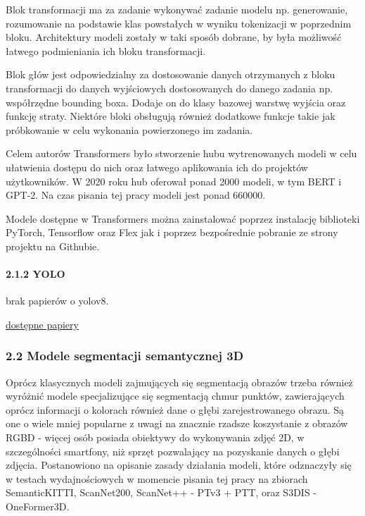 \documentclass[
]{article}
\begin{document}
Blok transformacji ma za zadanie wykonywać zadanie modelu np. generowanie, rozumowanie na podstawie klas powstałych w wyniku tokenizacji w poprzednim bloku. Architektury modeli zostały w taki sposób dobrane, by była możliwość łatwego podmieniania ich bloku transformacji.

Blok głów jest odpowiedzialny za dostosowanie danych otrzymanych z bloku transformacji do danych wyjściowych dostosowanych do danego zadania np. współrzędne bounding boxa. Dodaje on do klasy bazowej warstwę wyjścia oraz funkcję straty. Niektóre bloki obsługują również dodatkowe funkcje takie jak próbkowanie w celu wykonania powierzonego im zadania.

Celem autorów Transformers było stworzenie hubu wytrenowanych modeli w celu ułatwienia dostępu do nich oraz łatwego aplikowania ich do projektów użytkowników. W 2020 roku hub oferował ponad 2000 modeli, w tym BERT i GPT-2. Na czas pisania tej pracy modeli jest ponad 660000.

Modele dostępne w Transformers można zainstalować poprzez instalację biblioteki PyTorch, Tensorflow oraz Flex jak i poprzez bezpośrednie pobranie ze strony projektu na Githubie.

\paragraph{2.1.2 YOLO}\label{yolo}

brak papierów o yolov8.

\href{https://arxiv.org/pdf/2304.00501v1}{dostępne papiery}

\subsubsection{2.2 Modele segmentacji semantycznej 3D}\label{modele-segmentacji-semantycznej-3d}

Oprócz klasycznych modeli zajmujących się segmentacją obrazów trzeba również wyróżnić modele specjalizujące się segmentacją chmur punktów, zawierających oprócz informacji o kolorach również dane o głębi zarejestrowanego obrazu. Są one o wiele mniej popularne z uwagi na znacznie rzadsze koszystanie z obrazów RGBD - więcej osób posiada obiektywy do wykonywania zdjęć 2D, w szczególności smartfony, niż sprzęt pozwalający na pozyskanie danych o głębi zdjęcia. Postanowiono na opisanie zasady działania modeli, które odznaczyły się w testach wydajnościowych w momencie pisania tej pracy na zbiorach SemanticKITTI, ScanNet200, ScanNet++ - PTv3 + PTT, oraz S3DIS - OneFormer3D.
\end{document}
